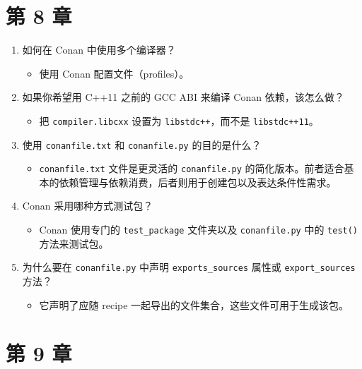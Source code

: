 \section*{第 8 章}

\begin{enumerate}
\item 如何在 Conan 中使用多个编译器？

\begin{itemize}
\item 使用 Conan 配置文件（profiles）。
\end{itemize}
\item 如果你希望用 C++11 之前的 GCC ABI 来编译 Conan 依赖，该怎么做？

\begin{itemize}
\item 把 \texttt{compiler.\allowbreak{}libcxx} 设置为 \texttt{libstdc++}，而不是 \texttt{libstdc+\allowbreak{}+\allowbreak{}11}。
\end{itemize}
\item 使用 \texttt{conanfile.\allowbreak{}txt} 和 \texttt{conanfile.\allowbreak{}py} 的目的是什么？

\begin{itemize}
\item \texttt{conanfile.\allowbreak{}txt} 文件是更灵活的 \texttt{conanfile.\allowbreak{}py} 的简化版本。前者适合基本的依赖管理与依赖消费，后者则用于创建包以及表达条件性需求。
\end{itemize}
\item Conan 采用哪种方式测试包？

\begin{itemize}
\item Conan 使用专门的 \texttt{test\_\allowbreak{}package} 文件夹以及 \texttt{conanfile.\allowbreak{}py} 中的 \texttt{test()} 方法来测试包。
\end{itemize}
\item 为什么要在 \texttt{conanfile.\allowbreak{}py} 中声明 \texttt{exports\_\allowbreak{}sources} 属性或 \texttt{export\_\allowbreak{}sources} 方法？

\begin{itemize}
\item 它声明了应随 recipe 一起导出的文件集合，这些文件可用于生成该包。
\end{itemize}
\end{enumerate}

\section*{第 9 章}

